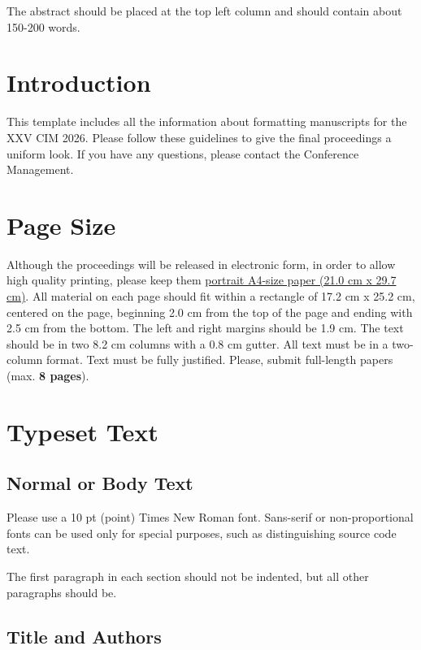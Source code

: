 \documentclass{article}
\title{\papertitle}
\begin{document}
%
\maketitle
%
\abstract
The abstract should be placed at the top left column and should contain about 150-200 words.
\endabstract
%

\section{Introduction}\label{sec:introduction}

This template includes all the information about formatting manuscripts for the XXV CIM 2026. Please follow these guidelines to give the final proceedings a uniform look. If you have any questions, please contact the Conference Management.

\section{Page Size}\label{sec:page_size}

Although the proceedings will be released in electronic form, in order to allow high quality printing, please keep them \underline{portrait A4-size paper (21.0 cm x 29.7 cm)}.
All material on each page should fit within a rectangle of 17.2 cm x 25.2 cm, centered on the page, beginning 2.0 cm from the top of the page and ending with 2.5 cm from the bottom. The left and right margins should be 1.9 cm. The text should be in two 8.2 cm columns with a 0.8 cm gutter. All text must be in a two-column format. Text must be fully justified. Please, submit full-length papers (max. {\bf 8 pages}).

\section{Typeset Text}\label{sec:typeset_text}

\subsection{Normal or Body Text}\label{subsec:body}

Please use a 10 pt (point) Times New Roman font. Sans-serif or non-proportional fonts can be used only for special purposes, such as distinguishing source code text.

The first paragraph in each section should not be indented, but all other paragraphs should be.

\subsection{Title and Authors}
\end{document}
